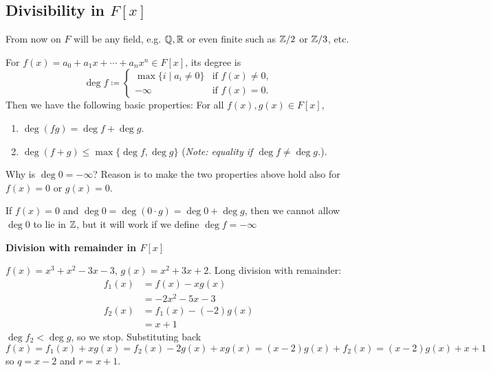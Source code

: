\documentclass[10pt, a4paper]{article}
\begin{document}
\subsection{Divisibility in \texorpdfstring{$F[x]$}{}}
From now on $F$ will be any field,
e.g. $\mathbb{Q}, \mathbb{R}$ or even finite such as $\mathbb{Z} / 2$ or $\mathbb{Z} / 3$,
etc.

For $f(x) = a_0 + a_1x + \dotsi + a_nx ^ n \in F[x]$,
its degree is
\[
\deg{f} \coloneqq \begin{cases}
    \max\{i \mid a_i \neq 0\} &\text{if } f(x) \neq 0, \\
     -\infty &\text{if } f(x) = 0.
\end{cases}
\]
Then we have the following basic properties:
For all $f(x), g(x) \in F[x]$,
\begin{enumerate}[label = (\roman*)]
    \item $\deg(fg) = \deg{f} + \deg{g}$.

    \item $\deg(f + g) \leq \max\{\deg{f}, \deg{g}\}$
    (\textit{Note:
    equality if $\deg{f} \neq \deg{g}$.}).
\end{enumerate}

Why is $\deg{0} = -\infty$?
Reason is to make the two properties above hold also for $f(x) = 0$ or $g(x) = 0$.

If $f(x) = 0$ and $\deg{0} = \deg(0 \cdot g) = \deg{0} + \deg{g}$,
then we cannot allow $\deg{0}$ to lie in $\mathbb{Z}$,
but it will work if we define $\deg{f} = -\infty$

\textbf{Division with remainder in $F[x]$}
\begin{example}
    $f(x) = x ^ 3 + x ^ 2 - 3x - 3$,
    $g(x) = x ^ 2 + 3x + 2$.
    Long division with remainder:
    \begin{align*}
        f_1(x) &= f(x) - xg(x) \\
        &= -2x ^ 2 - 5x - 3 \\
        f_2(x) &= f_1(x) - (-2)g(x) \\
        &= x + 1
    \end{align*}
    $\deg{f_2} < \deg{g}$,
    so we stop.
    Substituting back
    \[
    f(x) = f_1(x) + xg(x) = f_2(x) - 2g(x) + xg(x) = (x - 2)g(x) + f_2(x) = (x - 2)g(x) + x + 1
    \]
    so $q = x - 2$ and $r = x + 1$.
\end{example}
\end{document}

